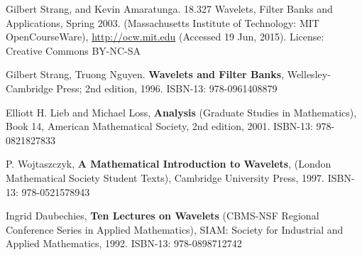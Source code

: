 \documentclass[twoside]{amsart}
\theoremstyle{plain}
\theoremstyle{definition}
\theoremstyle{remark}
\numberwithin{equation}{section}
\begin{document}
\begin{thebibliography}{9}
Gilbert Strang, and Kevin Amaratunga. 18.327 Wavelets, Filter Banks and Applications, Spring 2003. (Massachusetts Institute of Technology: MIT OpenCourseWare), \url{http://ocw.mit.edu} (Accessed 19 Jun, 2015). License: Creative Commons BY-NC-SA

Gilbert Strang, Truong Nguyen. \textbf{Wavelets and Filter Banks}, Wellesley-Cambridge Press; 2nd edition, 1996. ISBN-13: 978-0961408879

Elliott H. Lieb and Michael Loss, \textbf{Analysis} (Graduate Studies in Mathematics), Book 14, American Mathematical Society, 2nd edition, 2001. ISBN-13: 978-0821827833

P. Wojtaszczyk, \textbf{A Mathematical Introduction to Wavelets}, (London Mathematical Society Student Texts), Cambridge University Press, 1997. ISBN-13: 978-0521578943 

Ingrid Daubechies, \textbf{Ten Lectures on Wavelets} (CBMS-NSF Regional Conference Series in Applied Mathematics), SIAM: Society for Industrial and Applied Mathematics, 1992. ISBN-13: 978-0898712742 




\end{thebibliography}
\end{document}
